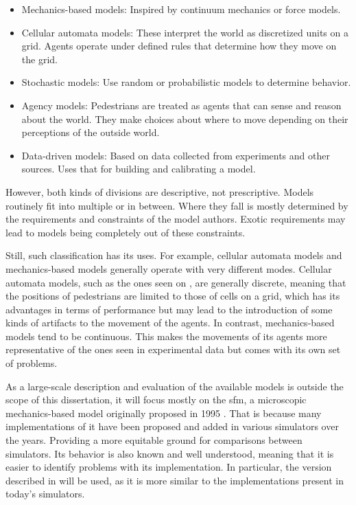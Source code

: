 \documentclass[twoside, 11pt]{article}
\begin{document}
\begin{itemize}
  \item Mechanics-based models: Inspired by continuum mechanics or force models.
  \item Cellular automata models: These interpret the world as discretized units on a grid. Agents operate under defined rules that determine how they move on the grid.
  \item Stochastic models: Use random or probabilistic models to determine behavior.
  \item Agency models: Pedestrians are treated as agents that can sense and reason about the world. They make choices about where to move depending on their perceptions of the outside world.
  \item Data-driven models: Based on data collected from experiments and other sources. Uses that for building and calibrating a model.
\end{itemize}

However, both kinds of divisions are descriptive, not prescriptive. Models routinely fit into multiple or in between. Where they fall is mostly determined by the requirements and constraints of the model authors. Exotic requirements may lead to models being completely out of these constraints.

Still, such classification has its uses. For example, cellular automata models and mechanics-based models generally operate with very different modes. Cellular automata models, such as the ones seen on \cite{HUANG2017417}, are generally discrete, meaning that the positions of pedestrians are limited to those of cells on a grid, which has its advantages in terms of performance but may lead to the introduction of some kinds of artifacts to the movement of the agents. In contrast, mechanics-based models tend to be continuous. This makes the movements of its agents more representative of the ones seen in experimental data but comes with its own set of problems.

As a large-scale description and evaluation of the available models is outside the scope of this dissertation, it will focus mostly on the \gls{sfm}, a microscopic mechanics-based model originally proposed in 1995 \cite{helbingSocialForceModel1995}. That is because many implementations of it have been proposed and added in various simulators over the years. Providing a more equitable ground for comparisons between simulators. Its behavior is also known and well understood, meaning that it is easier to identify problems with its implementation. In particular, the version described in \cite{helbingSimulatingDynamicFeatures2000} will be used, as it is more similar to the implementations present in today's simulators.
\end{document}
